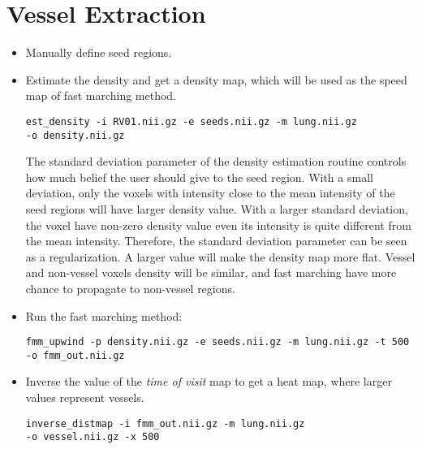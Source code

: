 \documentclass[11pt]{article}
\begin{document}
\section{Vessel Extraction}
\begin{itemize}
\item Manually define seed regions.

\item Estimate the density and get a density map, which will be used as the
  speed map of fast marching method. 
\begin{Verbatim}[frame=single]
est_density -i RV01.nii.gz -e seeds.nii.gz -m lung.nii.gz 
-o density.nii.gz
\end{Verbatim}
  The standard deviation parameter of the density estimation routine controls
  how much belief the user should give to the seed region. With a small
  deviation, only the voxels with intensity close to the mean intensity of the
  seed regions will have larger density value. With a larger standard
  deviation, the voxel have non-zero density value even its intensity is quite
  different from the mean intensity. Therefore, the standard deviation
  parameter can be seen as a regularization. A larger value will make the
  density map more flat. Vessel and non-vessel voxels density will be similar,
  and fast marching have more chance to propagate to non-vessel regions.

  \item Run the fast marching method:
\begin{Verbatim}[frame=single]
fmm_upwind -p density.nii.gz -e seeds.nii.gz -m lung.nii.gz -t 500 
-o fmm_out.nii.gz
\end{Verbatim}

\item Inverse the value of the \emph{time of visit} map to get a heat map,
  where larger values represent vessels. 
\begin{Verbatim}[frame=single]
inverse_distmap -i fmm_out.nii.gz -m lung.nii.gz 
-o vessel.nii.gz -x 500
\end{Verbatim}
\end{itemize}



\end{document}
